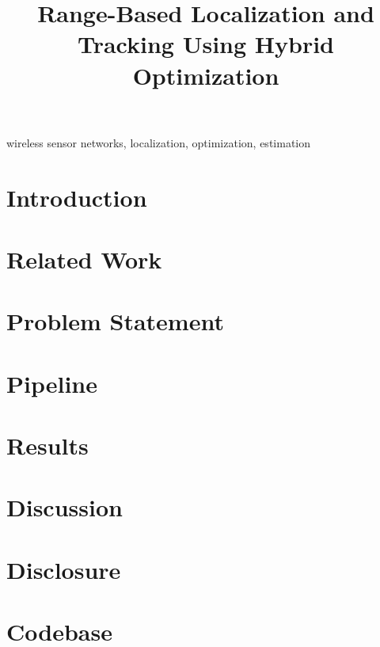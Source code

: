 \documentclass[conference]{IEEEtran}
\begin{document}
\title{Range-Based Localization and Tracking Using Hybrid Optimization}

\author{
}

\maketitle

\begin{abstract}


\end{abstract}

\begin{IEEEkeywords}
wireless sensor networks, localization, optimization, estimation
\end{IEEEkeywords}

\section{Introduction}
\label{sec:intro}


\section{Related Work}
\label{sec:related-work}


\section{Problem Statement}
\label{sec:prob-statement}



\section{Pipeline}
\label{sec:pipeline}


\section{Results}



\section{Discussion}



\section{Disclosure}



\section{Codebase}



\printbibliography
\end{document}
